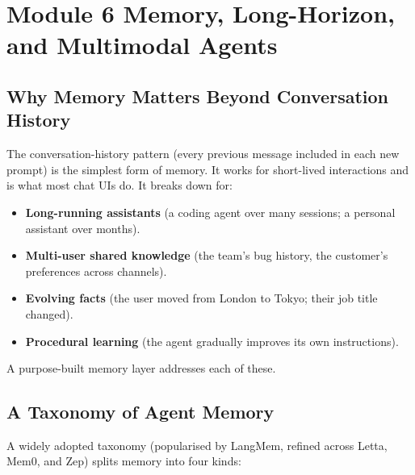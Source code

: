\documentclass[a4paper,11pt]{article}
\begin{document}
\section{Module 6 \textemdash{} Memory, Long-Horizon, and Multimodal Agents}

\subsection{Why Memory Matters Beyond Conversation History}

The conversation-history pattern (every previous message included in
each new prompt) is the simplest form of memory. It works for
short-lived interactions and is what most chat UIs do. It breaks
down for:

\begin{itemize}[noitemsep, leftmargin=1.2em]
  \item \textbf{Long-running assistants} (a coding agent over many
        sessions; a personal assistant over months).
  \item \textbf{Multi-user shared knowledge} (the team's bug
        history, the customer's preferences across channels).
  \item \textbf{Evolving facts} (the user moved from London to
        Tokyo; their job title changed).
  \item \textbf{Procedural learning} (the agent gradually improves
        its own instructions).
\end{itemize}

A purpose-built memory layer addresses each of these.

\subsection{A Taxonomy of Agent Memory}

A widely adopted taxonomy (popularised by LangMem, refined across
Letta, Mem0, and Zep) splits memory into four kinds:
\end{document}
